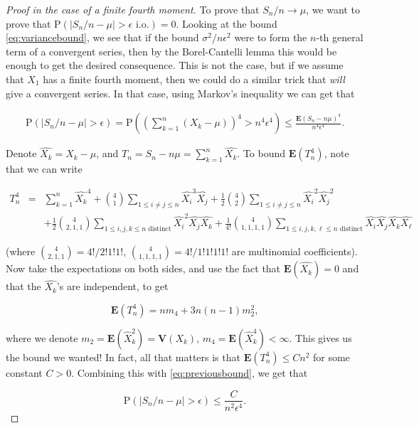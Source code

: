 \begin{proof}[Proof in the case of a finite fourth moment]
To prove that $S_n/n\to \mu$, we want to prove that
$\mathrm{P}(|S_n/n-\mu|>\epsilon\textrm{ i.o.})=0$.
Looking at the bound \eqref{eq:variancebound}, we see that
if the bound $\sigma^2/n\epsilon^2$ were to form the
$n$-th general term of a convergent series, then by
the Borel-Cantelli lemma this would be enough to get
the desired consequence. This is not the case, but if
we assume that $X_1$ has a finite fourth moment, then
we could do a similar trick that \emph{will} give a
convergent series. In that case, using Markov's
inequality we can get that

\begin{align*}
\tag{8}\label{eq:previousbound}
\mathrm{P}(|S_n/n-\mu|>\epsilon) = \mathrm{P}\left(\left( \sum_{k=1}^n (X_k-\mu) \right)^4 > n^4 \epsilon^4\right)
\le \frac{\mathbf{E}(S_n-n\mu)^4}{n^4 \epsilon^4}.
\end{align*}

\noindent Denote $\hat{X_k}=X_k-\mu$, and
$T_n = S_n-n\mu= \sum_{k=1}^n \hat{X_k}$. To bound
$\mathbf{E}(T_n^4)$, note that we can write

\begin{eqnarray*}
T_n^4 &=& \sum_{k=1}^n \hat{X_k}^4 + \binom{4}{1} \sum_{1 \le i\neq j \le n} \hat{X_i}^3 \hat{X_j}
+ \frac12\binom{4}{2}\sum_{1 \le i\neq j \le n} \hat{X_i}^2 \hat{X_j}^2 \\
& & + \frac12\binom{4}{2,1,1} \sum_{1\le i,j,k \le n\textrm{ distinct}} \hat{X_i}^2 \hat{X_j} \hat{X_k}
+ \frac{1}{4!}\binom{4}{1,1,1,1} \sum_{1 \le i,j,k,\ell \le n\textrm{ distinct}} \hat{X_i} \hat{X_j} \hat{X_k} \hat{X_\ell}
\end{eqnarray*}

\noindent (where $\binom{4}{2,1,1}=4!/2!1!1!$,
$\binom{4}{1,1,1,1}=4!/1!1!1!1!$ are multinomial
coefficients). Now take the expectations on both
sides, and use the fact that
$\mathbf{E}(\hat{X_k}) = 0$ and that the $\hat{X_k}$'s
are independent, to get

\[
\mathbf{E}(T_n^4) = n m_4 + 3n(n-1) m_2^2,
\]

\noindent where we denote
$m_2 = \mathbf{E}(\hat{X}_k^2) = \mathbf{V}(X_k)$,
$m_4=\mathbf{E}(\hat{X}_k^4)<\infty$. This gives us
the bound we wanted! In fact, all that matters is that
$\mathbf{E}(T_n^4)\le C n^2$ for some constant $C>0$.
Combining this with \eqref{eq:previousbound}, we get that

\[
\mathrm{P}(|S_n/n-\mu|>\epsilon) \le \frac{C}{n^2 \epsilon^4}.
\]


\end{proof}
